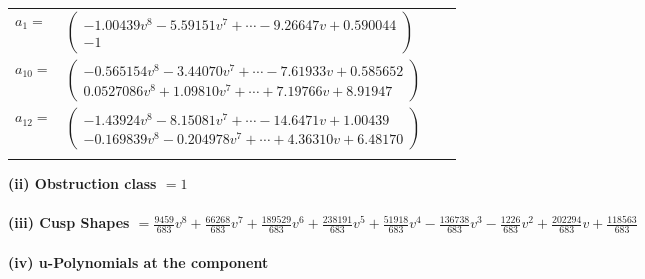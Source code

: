 \documentclass[1p]{elsarticle_modified}
\theoremstyle{definition}
\begin{document}
\begin{tabular}{m{7pt} m{180pt} m{7pt} m{180pt} }
\flushright $a_{1}=$&$\begin{pmatrix}-1.00439 v^{8}-5.59151 v^{7}+\cdots-9.26647 v+0.590044\\-1\end{pmatrix}$ \\
\flushright $a_{10}=$&$\begin{pmatrix}-0.565154 v^{8}-3.44070 v^{7}+\cdots-7.61933 v+0.585652\\0.0527086 v^{8}+1.09810 v^{7}+\cdots+7.19766 v+8.91947\end{pmatrix}$ \\
\flushright $a_{12}=$&$\begin{pmatrix}-1.43924 v^{8}-8.15081 v^{7}+\cdots-14.6471 v+1.00439\\-0.169839 v^{8}-0.204978 v^{7}+\cdots+4.36310 v+6.48170\end{pmatrix}$\\&\end{tabular}
\flushleft \textbf{(ii) Obstruction class $= 1$}\\~\\
\flushleft \textbf{(iii) Cusp Shapes $= \frac{9459}{683} v^8+\frac{66268}{683} v^7+\frac{189529}{683} v^6+\frac{238191}{683} v^5+\frac{51918}{683} v^4-\frac{136738}{683} v^3-\frac{1226}{683} v^2+\frac{202294}{683} v+\frac{118563}{683}$}\\~\\
\newpage\renewcommand{\arraystretch}{1}
\flushleft \textbf{(iv) u-Polynomials at the component}\newline \\
\end{document}
